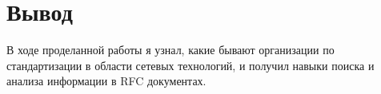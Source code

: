 \chapter{Вывод}
\label{ch:chap3}

В ходе проделанной работы я узнал, какие бывают организации по стандартизации в области сетевых технологий, и получил навыки поиска
и анализа информации в RFC документах.

\endinput